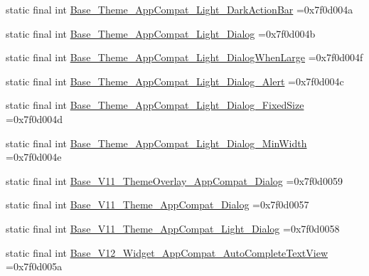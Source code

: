 \begin{DoxyCompactItemize}
\item 
static final int \mbox{\hyperlink{classbr_1_1unb_1_1cic_1_1mp_1_1marketmaster_1_1R_1_1style_a768e9991ac4c5fefbd7e11d6586c88e8}{Base\+\_\+\+Theme\+\_\+\+App\+Compat\+\_\+\+Light\+\_\+\+Dark\+Action\+Bar}} =0x7f0d004a
\item 
static final int \mbox{\hyperlink{classbr_1_1unb_1_1cic_1_1mp_1_1marketmaster_1_1R_1_1style_adc63016b53d0db6ed1b5264097d82ebc}{Base\+\_\+\+Theme\+\_\+\+App\+Compat\+\_\+\+Light\+\_\+\+Dialog}} =0x7f0d004b
\item 
static final int \mbox{\hyperlink{classbr_1_1unb_1_1cic_1_1mp_1_1marketmaster_1_1R_1_1style_a8505917bee1b434c6343df8e813c212e}{Base\+\_\+\+Theme\+\_\+\+App\+Compat\+\_\+\+Light\+\_\+\+Dialog\+When\+Large}} =0x7f0d004f
\item 
static final int \mbox{\hyperlink{classbr_1_1unb_1_1cic_1_1mp_1_1marketmaster_1_1R_1_1style_ae05020c8cc7988bfc91596dc3b534c15}{Base\+\_\+\+Theme\+\_\+\+App\+Compat\+\_\+\+Light\+\_\+\+Dialog\+\_\+\+Alert}} =0x7f0d004c
\item 
static final int \mbox{\hyperlink{classbr_1_1unb_1_1cic_1_1mp_1_1marketmaster_1_1R_1_1style_ab0f5f6ee027542db06c272e7cc060444}{Base\+\_\+\+Theme\+\_\+\+App\+Compat\+\_\+\+Light\+\_\+\+Dialog\+\_\+\+Fixed\+Size}} =0x7f0d004d
\item 
static final int \mbox{\hyperlink{classbr_1_1unb_1_1cic_1_1mp_1_1marketmaster_1_1R_1_1style_a0e779ae5faa409cc2875bcadeb3b8745}{Base\+\_\+\+Theme\+\_\+\+App\+Compat\+\_\+\+Light\+\_\+\+Dialog\+\_\+\+Min\+Width}} =0x7f0d004e
\item 
static final int \mbox{\hyperlink{classbr_1_1unb_1_1cic_1_1mp_1_1marketmaster_1_1R_1_1style_aeec1e5f5d02b61d633ff34e747801039}{Base\+\_\+\+V11\+\_\+\+Theme\+Overlay\+\_\+\+App\+Compat\+\_\+\+Dialog}} =0x7f0d0059
\item 
static final int \mbox{\hyperlink{classbr_1_1unb_1_1cic_1_1mp_1_1marketmaster_1_1R_1_1style_a5c856166cff51195d4f498f084a6ef95}{Base\+\_\+\+V11\+\_\+\+Theme\+\_\+\+App\+Compat\+\_\+\+Dialog}} =0x7f0d0057
\item 
static final int \mbox{\hyperlink{classbr_1_1unb_1_1cic_1_1mp_1_1marketmaster_1_1R_1_1style_acbb5205d6a56981e6affb14045b3c661}{Base\+\_\+\+V11\+\_\+\+Theme\+\_\+\+App\+Compat\+\_\+\+Light\+\_\+\+Dialog}} =0x7f0d0058
\item 
static final int \mbox{\hyperlink{classbr_1_1unb_1_1cic_1_1mp_1_1marketmaster_1_1R_1_1style_ab82c00e22f89b671e30a7f6c6c5f6bc9}{Base\+\_\+\+V12\+\_\+\+Widget\+\_\+\+App\+Compat\+\_\+\+Auto\+Complete\+Text\+View}} =0x7f0d005a

\end{DoxyCompactItemize}
